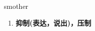 
\begin{frame}
{\huge smother}
\begin{center}
\begin{enumerate}\Large
  \item \textbf{抑制(表达，说出)，压制}
\end{enumerate}
\end{center}
\end{frame}
